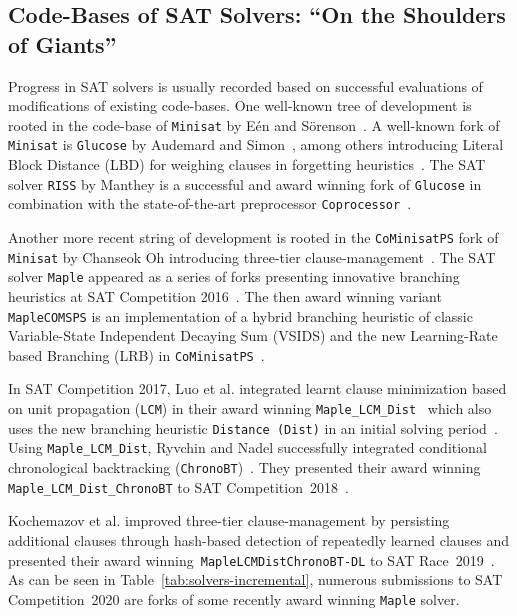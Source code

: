 \documentclass{elsarticle}
\newcommand{\solver}[1]{\texttt{#1}}
\begin{document}
\subsection{Code-Bases of SAT Solvers: ``On the Shoulders of Giants''}
\label{sec:codebases}

Progress in SAT solvers is usually recorded based on successful evaluations of  modifications of existing code-bases. 
One well-known tree of development is rooted in the code-base of \solver{Minisat} by Eén and Sörenson~\cite{Niklas:2003:Minisat}. 
A well-known fork of \solver{Minisat} is \solver{Glucose} by Audemard and Simon~\cite{Audemard:2018:Glucose}, among others introducing Literal Block Distance (LBD) for weighing clauses in forgetting heuristics~\cite{Audemard:2009:Glucose}. 
The SAT solver \solver{RISS} by Manthey is a successful and award winning fork of \solver{Glucose} in combination with the state-of-the-art preprocessor \solver{Coprocessor}~\cite{Manthey:2012:Coprocessor2}. 

Another more recent string of development is rooted in the \solver{CoMinisatPS} fork of \solver{Minisat} by Chanseok Oh introducing three-tier clause-management~\cite{Oh:2015:satunsat}. 
The SAT solver \solver{Maple} appeared as a series of forks presenting innovative branching heuristics at SAT Competition 2016~\cite{Liang:2016:LRB}. 
The then award winning variant \solver{MapleCOMSPS} is an implementation of a hybrid branching heuristic of classic Variable-State Independent Decaying Sum (VSIDS) and the new Learning-Rate based Branching (LRB) in \solver{CoMinisatPS}~\cite{Liang:2016:MapleCOMSPS}. 

In SAT Competition 2017, Luo et al. integrated learnt clause minimization based on unit propagation (\solver{LCM}) in their award winning \solver{Maple\_LCM\_Dist}~\cite{Luo:2017:LCM} which also uses the new branching heuristic \solver{Distance (Dist)} in an initial solving period~\cite{Xiao:2017:MapleLCMDist}. 
Using \solver{Maple\_LCM\_Dist}, Ryvchin and Nadel successfully integrated conditional chronological backtracking (\solver{ChronoBT})~\cite{Nadel:2018:CBT}. 
They presented their award winning \solver{Maple\_LCM\_Dist\_ChronoBT} to SAT Competition~2018~\cite{Ryvchin:SC2018:MapleChronoBT}. 

Kochemazov et al. improved three-tier clause-management by persisting
additional clauses through hash-based detection of repeatedly learned clauses and presented their award winning~\solver{MapleLCMDistChronoBT-DL} to SAT Race~2019~\cite{Kochemazov:SC2019:MapleChronoBTDL}. 
As can be seen in Table~\ref{tab:solvers-incremental}, numerous submissions to SAT Competition~2020 are forks of some recently award winning \solver{Maple} solver. 
\end{document}
